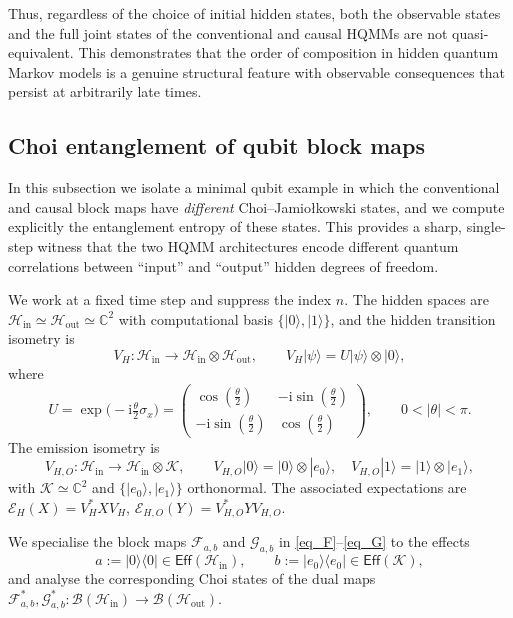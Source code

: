 \documentclass[11pt, reco]{article}
\begin{document}
 

Thus, regardless of the choice of initial hidden states, both the observable states and the full joint states of the conventional and causal HQMMs are not quasi-equivalent. This demonstrates that the order of composition in hidden quantum Markov models is a genuine structural feature with observable consequences that persist at arbitrarily late times.

 
\subsection{Choi entanglement of qubit block maps}

In this subsection we isolate a minimal qubit example in which the conventional and causal block maps
have \emph{different} Choi–Jamiołkowski states, and we compute explicitly the entanglement entropy of
these states. This provides a sharp, single-step witness that the two HQMM architectures encode
different quantum correlations between “input” and “output” hidden degrees of freedom.

We work at a fixed time step and suppress the index \(n\). The hidden spaces are
\(\mathcal{H}_{\mathrm{in}}\simeq\mathcal{H}_{\mathrm{out}}\simeq\mathbb{C}^2\) with computational basis
\(\{|0\rangle,|1\rangle\}\), and the hidden transition isometry is
\[
V_H:\mathcal{H}_{\mathrm{in}}\to\mathcal{H}_{\mathrm{in}}\otimes\mathcal{H}_{\mathrm{out}},
\qquad
V_H|\psi\rangle
=
U|\psi\rangle\otimes|0\rangle,
\]
where
\[
U
=
\exp\!\bigl(-\mathrm{i}\tfrac{\theta}{2}\sigma_x\bigr)
=
\begin{pmatrix}
\cos(\tfrac{\theta}{2}) & -\mathrm{i}\sin(\tfrac{\theta}{2})\\[0.25em]
-\mathrm{i}\sin(\tfrac{\theta}{2}) & \cos(\tfrac{\theta}{2})
\end{pmatrix},
\qquad 0<|\theta|<\pi.
\]
The emission isometry is
\[
V_{H,O}:\mathcal{H}_{\mathrm{in}}\to\mathcal{H}_{\mathrm{in}}\otimes\mathcal{K},
\qquad
V_{H,O}|0\rangle
=
|0\rangle\otimes|e_0\rangle,
\quad
V_{H,O}|1\rangle
=
|1\rangle\otimes|e_1\rangle,
\]
with \(\mathcal{K}\simeq\mathbb{C}^2\) and \(\{|e_0\rangle,|e_1\rangle\}\) orthonormal. The associated expectations are
\(\mathcal{E}_H(X)=V_H^{*}X V_H\), \(\mathcal{E}_{H,O}(Y)=V_{H,O}^{*}Y V_{H,O}\).

We specialise the block maps \(\mathcal{F}_{a,b}\) and \(\mathcal{G}_{a,b}\) in \eqref{eq_F}–\eqref{eq_G} to the effects
\[
a:=|0\rangle\langle 0|\in\mathsf{Eff}(\mathcal{H}_{\mathrm{in}}),
\qquad
b:=|e_0\rangle\langle e_0|\in\mathsf{Eff}(\mathcal{K}),
\]
and analyse the corresponding Choi states of the dual maps
\(\mathcal{F}_{a,b}^*,\mathcal{G}_{a,b}^*:\mathcal{B}(\mathcal{H}_{\mathrm{in}})\to\mathcal{B}(\mathcal{H}_{\mathrm{out}})\).
\end{document}
